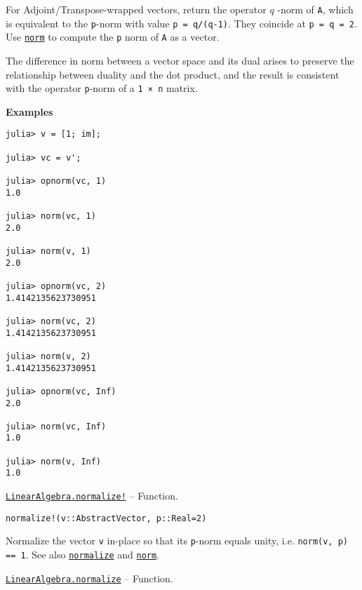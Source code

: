 \begin{adjustwidth}{2em}{0pt}
For Adjoint/Transpose-wrapped vectors, return the operator  \(q\) -norm of \texttt{A}, which is equivalent to the \texttt{p}-norm with value \texttt{p = q/(q-1)}. They coincide at \texttt{p = q = 2}. Use \hyperlink{898926013064269707}{\texttt{norm}} to compute the \texttt{p} norm of \texttt{A} as a vector.

The difference in norm between a vector space and its dual arises to preserve the relationship between duality and the dot product, and the result is consistent with the operator \texttt{p}-norm of a \texttt{1 × n} matrix.

\textbf{Examples}


\begin{verbatim}
julia> v = [1; im];

julia> vc = v';

julia> opnorm(vc, 1)
1.0

julia> norm(vc, 1)
2.0

julia> norm(v, 1)
2.0

julia> opnorm(vc, 2)
1.4142135623730951

julia> norm(vc, 2)
1.4142135623730951

julia> norm(v, 2)
1.4142135623730951

julia> opnorm(vc, Inf)
2.0

julia> norm(vc, Inf)
1.0

julia> norm(v, Inf)
1.0
\end{verbatim}



\end{adjustwidth}
\hypertarget{7806117778219468080}{} 
\hyperlink{7806117778219468080}{\texttt{LinearAlgebra.normalize!}}  -- {Function.}

\begin{adjustwidth}{2em}{0pt}


\begin{verbatim}
normalize!(v::AbstractVector, p::Real=2)
\end{verbatim}

Normalize the vector \texttt{v} in-place so that its \texttt{p}-norm equals unity, i.e. \texttt{norm(v, p) == 1}. See also \hyperlink{10731692832589480792}{\texttt{normalize}} and \hyperlink{898926013064269707}{\texttt{norm}}.



\end{adjustwidth}
\hypertarget{10731692832589480792}{} 
\hyperlink{10731692832589480792}{\texttt{LinearAlgebra.normalize}}  -- {Function.}

